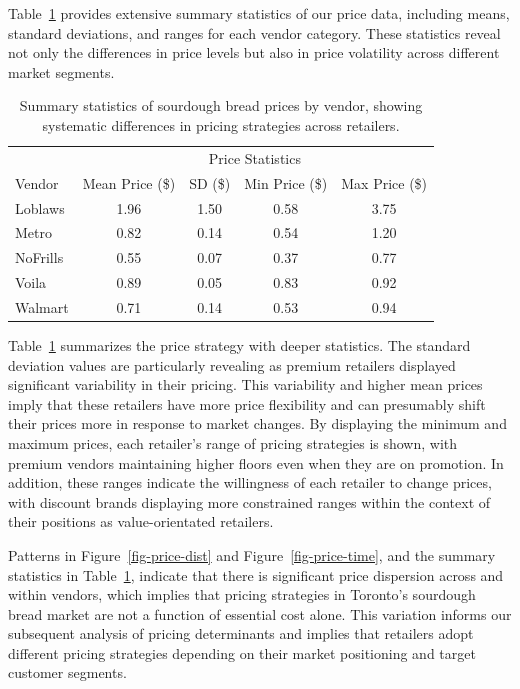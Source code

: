 \documentclass[
  letterpaper,
  DIV=11,
  numbers=noendperiod]{scrartcl}
\begin{document}
Table~\ref{tbl-price-summary} provides extensive summary statistics of
our price data, including means, standard deviations, and ranges for
each vendor category. These statistics reveal not only the differences
in price levels but also in price volatility across different market
segments.

\begin{longtable}[t]{lcccc}

\caption{\label{tbl-price-summary}Summary statistics of sourdough bread
prices by vendor, showing systematic differences in pricing strategies
across retailers.}

\tabularnewline

\toprule
\multicolumn{1}{c}{ } & \multicolumn{4}{c}{Price Statistics} \\
\cmidrule(l{3pt}r{3pt}){2-5}
Vendor & Mean Price (\$) & SD (\$) & Min Price (\$) & Max Price (\$)\\
\midrule
Loblaws & 1.96 & 1.50 & 0.58 & 3.75\\
Metro & 0.82 & 0.14 & 0.54 & 1.20\\
NoFrills & 0.55 & 0.07 & 0.37 & 0.77\\
Voila & 0.89 & 0.05 & 0.83 & 0.92\\
Walmart & 0.71 & 0.14 & 0.53 & 0.94\\
\bottomrule

\end{longtable}

Table~\ref{tbl-price-summary} summarizes the price strategy with deeper
statistics. The standard deviation values are particularly revealing as
premium retailers displayed significant variability in their pricing.
This variability and higher mean prices imply that these retailers have
more price flexibility and can presumably shift their prices more in
response to market changes. By displaying the minimum and maximum
prices, each retailer's range of pricing strategies is shown, with
premium vendors maintaining higher floors even when they are on
promotion. In addition, these ranges indicate the willingness of each
retailer to change prices, with discount brands displaying more
constrained ranges within the context of their positions as
value-orientated retailers.

Patterns in Figure~\ref{fig-price-dist} and Figure~\ref{fig-price-time},
and the summary statistics in Table~\ref{tbl-price-summary}, indicate
that there is significant price dispersion across and within vendors,
which implies that pricing strategies in Toronto's sourdough bread
market are not a function of essential cost alone. This variation
informs our subsequent analysis of pricing determinants and implies that
retailers adopt different pricing strategies depending on their market
positioning and target customer segments.
\end{document}
